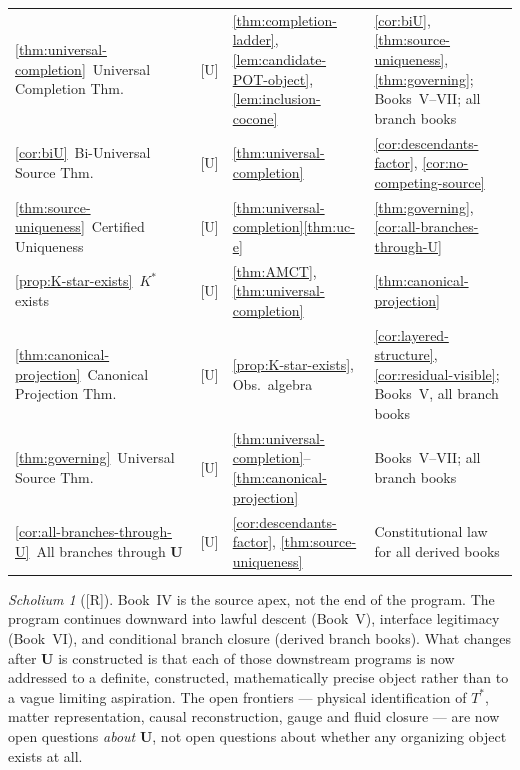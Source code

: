 \documentclass[12pt,oneside]{amsbook}
\theoremstyle{plain}
\theoremstyle{definition}
\theoremstyle{remark}
\newtheorem{scholium}[theorem]{Scholium}
\newcommand{\status}[1]{\textup{[#1]}}
\begin{document}
\begin{tabular}{@{}p{4.2cm}p{0.8cm}p{3.4cm}p{4.6cm}@{}}
\ref{thm:universal-completion}\ Universal Completion Thm.
  & [U] & \ref{thm:completion-ladder}, \ref{lem:candidate-POT-object},
    \ref{lem:inclusion-cocone}
  & \ref{cor:biU}, \ref{thm:source-uniqueness}, \ref{thm:governing};
    Books~V--VII; all branch books \\

\ref{cor:biU}\ Bi-Universal Source Thm.
  & [U] & \ref{thm:universal-completion}
  & \ref{cor:descendants-factor}, \ref{cor:no-competing-source} \\

\ref{thm:source-uniqueness}\ Certified Uniqueness
  & [U] & \ref{thm:universal-completion}\ref{thm:uc-e}
  & \ref{thm:governing}, \ref{cor:all-branches-through-U} \\

\ref{prop:K-star-exists}\ $K^*$ exists
  & [U] & \ref{thm:AMCT}, \ref{thm:universal-completion}
  & \ref{thm:canonical-projection} \\

\ref{thm:canonical-projection}\ Canonical Projection Thm.
  & [U] & \ref{prop:K-star-exists}, Obs.\ algebra
  & \ref{cor:layered-structure}, \ref{cor:residual-visible};
    Books~V, all branch books \\

\ref{thm:governing}\ Universal Source Thm.
  & [U] & \ref{thm:universal-completion}--\ref{thm:canonical-projection}
  & Books~V--VII; all branch books \\

\ref{cor:all-branches-through-U}\ All branches through $\mathbf{U}$
  & [U] & \ref{cor:descendants-factor}, \ref{thm:source-uniqueness}
  & Constitutional law for all derived books \\
\hline
\end{tabular}
\renewcommand{\arraystretch}{1}

\medskip

\begin{scholium}[\status{R}]\label{sch:book-iv-posture}
Book~IV is the source apex, not the end of the program.  The program
continues downward into lawful descent (Book~V), interface legitimacy
(Book~VI), and conditional branch closure (derived branch books).  What
changes after $\mathbf{U}$ is constructed is that each of those
downstream programs is now addressed to a definite, constructed,
mathematically precise object rather than to a vague limiting
aspiration.  The open frontiers --- physical identification of $T^*$,
matter representation, causal reconstruction, gauge and fluid closure
--- are now open questions \emph{about} $\mathbf{U}$, not open
questions about whether any organizing object exists at all.
\end{scholium}
\end{document}
